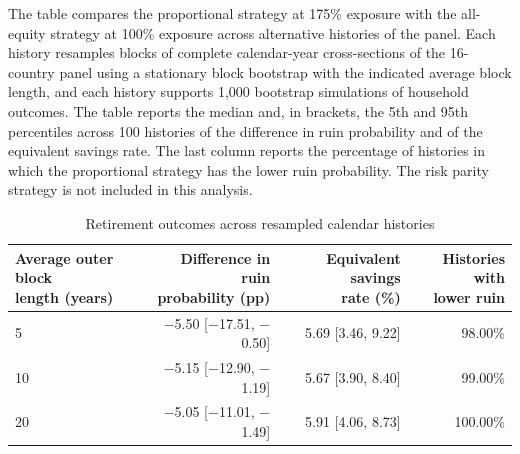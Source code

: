 \begin{table}[p]\centering
\caption{Retirement outcomes across resampled calendar histories}\label{tab:restored-history}
\begin{minipage}{\linewidth}\small The table compares the proportional strategy at 175\% exposure with the all-equity strategy at 100\% exposure across alternative histories of the panel. Each history resamples blocks of complete calendar-year cross-sections of the 16-country panel using a stationary block bootstrap with the indicated average block length, and each history supports 1,000 bootstrap simulations of household outcomes. The table reports the median and, in brackets, the 5th and 95th percentiles across 100 histories of the difference in ruin probability and of the equivalent savings rate. The last column reports the percentage of histories in which the proportional strategy has the lower ruin probability. The risk parity strategy is not included in this analysis.\end{minipage}
\medskip

{\small\setlength{\tabcolsep}{4pt}\begin{tabular}{lrrr}\toprule
\shortstack{Average outer block\\ length (years)} & \shortstack{Difference in ruin\\ probability (pp)} & \shortstack{Equivalent savings\\ rate (\%)} & \shortstack{Histories with\\ lower ruin} \\ \midrule
5 & $-$5.50 [$-$17.51, $-$0.50] & 5.69 [3.46, 9.22] & 98.00\% \\
10 & $-$5.15 [$-$12.90, $-$1.19] & 5.67 [3.90, 8.40] & 99.00\% \\
20 & $-$5.05 [$-$11.01, $-$1.49] & 5.91 [4.06, 8.73] & 100.00\% \\
\bottomrule\end{tabular}}
\end{table}
